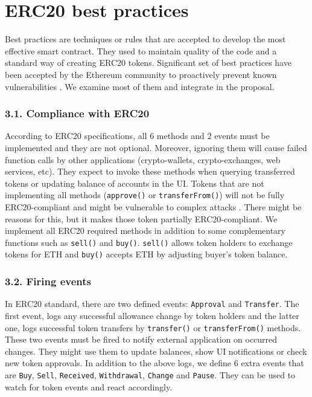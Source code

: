 
\section{ERC20 best practices}\label{section:bp}
Best practices are techniques or rules that are accepted to develop the most effective smart contract. They used to maintain quality of the code and a standard way of creating ERC20 tokens. Significant set of best practices have been accepted by the Ethereum community to proactively prevent known vulnerabilities \cite{TokenBP}. We examine most of them and integrate in the proposal.

\subsubsection*{3.1. Compliance with ERC20}
According to ERC20 specifications, all 6 methods and 2 events must be implemented and they are not optional. Moreover, ignoring them will cause failed function calls by other applications (\ie crypto-wallets, crypto-exchanges, web services, etc). They expect to invoke these methods when querying transferred tokens or updating balance of accounts in the UI. Tokens that are not implementing all methods (\eg \texttt{approve()} or \texttt{transferFrom()}) will not be fully ERC20-compliant and might be vulnerable to complex attacks \cite{DEPOSafe}. There might be reasons for this, but it makes those token partially ERC20-compliant. We implement all ERC20 required methods in addition to some complementary functions such as \texttt{sell()} and \texttt{buy()}. \texttt{sell()} allows token holders to exchange tokens for ETH and \texttt{buy()} accepts ETH by adjusting buyer's token balance.

\subsubsection*{3.2. Firing events}
In ERC20 standard, there are two defined events: \texttt{Approval} and \texttt{Transfer}. The first event, logs any successful allowance change by token holders and the latter one, logs successful token transfers by \texttt{transfer()} or \texttt{transferFrom()} methods. These two events must be fired to notify external application on occurred changes. They might use them to update balances, show UI notifications or check new token approvals. In addition to the above logs, we define 6 extra events that are \texttt{Buy}, \texttt{Sell}, \texttt{Received}, \texttt{Withdrawal}, \texttt{Change} and \texttt{Pause}. They can be used to watch for token events and react accordingly.

